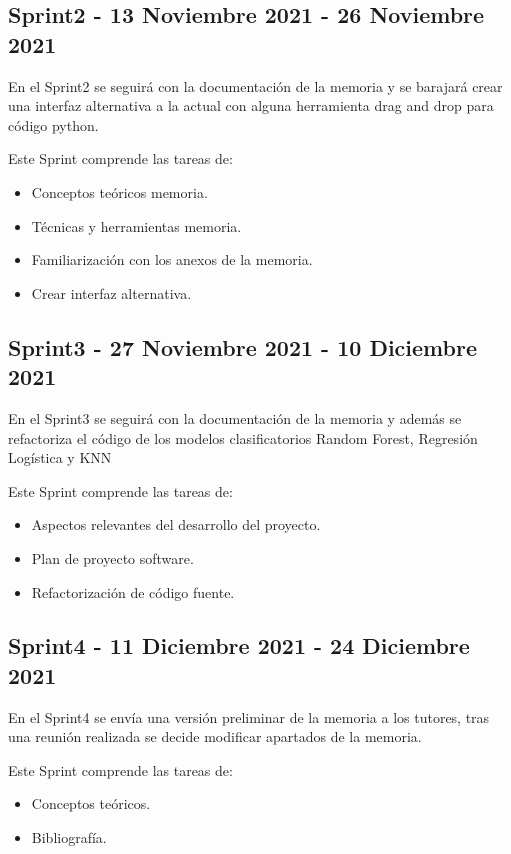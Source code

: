\subsection{Sprint2 - 13 Noviembre 2021 - 26 Noviembre 2021}

En el Sprint2 se seguirá con la documentación de la memoria y se barajará crear una interfaz alternativa a la actual con alguna herramienta drag and drop para código python.

Este Sprint comprende las tareas de:

\begin{itemize}
\item Conceptos teóricos memoria.
\item Técnicas y herramientas memoria.
\item Familiarización con los anexos de la memoria.
\item Crear interfaz alternativa.
\end{itemize}

\subsection{Sprint3 - 27 Noviembre 2021 - 10 Diciembre 2021}

En el Sprint3 se seguirá con la documentación de la memoria y además se refactoriza el código de los modelos clasificatorios Random Forest, Regresión Logística y KNN

Este Sprint comprende las tareas de:

\begin{itemize}
\item Aspectos relevantes del desarrollo del proyecto.
\item Plan de proyecto software.
\item Refactorización de código fuente.
\end{itemize}

\subsection{Sprint4 - 11 Diciembre 2021 - 24 Diciembre 2021}

En el Sprint4 se envía una versión preliminar de la memoria a los tutores, tras una reunión realizada se decide modificar apartados de la memoria.

Este Sprint comprende las tareas de:

\begin{itemize}
\item Conceptos teóricos.
\item Bibliografía.
\end{itemize}

